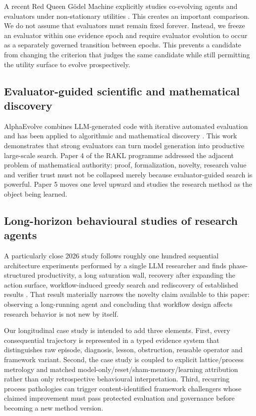A recent Red Queen G\"odel Machine explicitly studies co-evolving agents and evaluators under non-stationary utilities \cite{iacob2026redqueen}. This creates an important comparison. We do not assume that evaluators must remain fixed forever. Instead, we freeze an evaluator within one evidence epoch and require evaluator evolution to occur as a separately governed transition between epochs. This prevents a candidate from changing the criterion that judges the same candidate while still permitting the utility surface to evolve prospectively.

\subsection{Evaluator-guided scientific and mathematical discovery}

AlphaEvolve combines LLM-generated code with iterative automated evaluation and has been applied to algorithmic and mathematical discovery \cite{novikov2025alphaevolve,georgiev2025mathscale}. This work demonstrates that strong evaluators can turn model generation into productive large-scale search. Paper 4 of the RAKL programme addressed the adjacent problem of mathematical authority: proof, formalization, novelty, research value and verifier trust must not be collapsed merely because evaluator-guided search is powerful. Paper 5 moves one level upward and studies the research method as the object being learned.

\subsection{Long-horizon behavioural studies of research agents}

A particularly close 2026 study follows roughly one hundred sequential architecture experiments performed by a single LLM researcher and finds phase-structured productivity, a long saturation wall, recovery after expanding the action surface, workflow-induced greedy search and rediscovery of established results \cite{safdar2026longhorizon}. That result materially narrows the novelty claim available to this paper: observing a long-running agent and concluding that workflow design affects research behavior is not new by itself.

Our longitudinal case study is intended to add three elements. First, every consequential trajectory is represented in a typed evidence system that distinguishes raw episode, diagnosis, lesson, obstruction, reusable operator and framework variant. Second, the case study is coupled to explicit lattice/process metrology and matched model-only/reset/sham-memory/learning attribution rather than only retrospective behavioural interpretation. Third, recurring process pathologies can trigger content-identified framework challengers whose claimed improvement must pass protected evaluation and governance before becoming a new method version.

